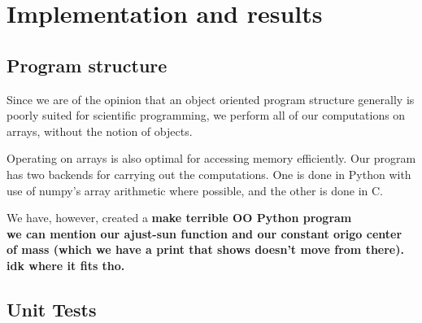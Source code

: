 \documentclass[a4paper]{article}
\begin{document}






\section{Implementation and results}\label{sec:implementation_and_results}
\subsection{Program structure}
Since we are of the opinion that an object oriented program structure generally is poorly suited for scientific programming, we perform all of our computations on arrays, without the notion of objects.

Operating on arrays is also optimal for accessing memory efficiently. Our program has two backends for carrying out the computations. One is done in Python with use of numpy's array arithmetic where possible, and the other is done in C.

We have, however, created a \textbf{make terrible OO Python program}
\\
\textbf{we can mention our ajust-sun function and our constant origo center of mass (which we have a print that shows doesn't move from there). idk where it fits tho.}
\\
\subsection{Unit Tests}
\end{document}
